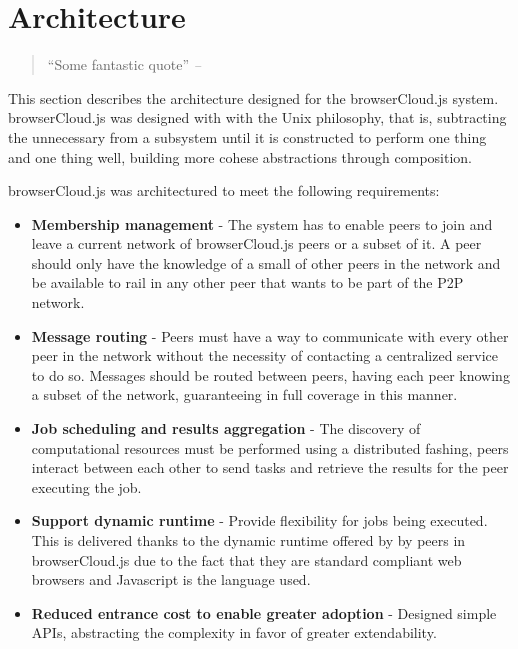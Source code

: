 \chapter{Architecture}\label{ch:architecture}

\begin{quotation}
“Some fantastic quote”
{\small\it --  }
\end{quotation}

This section describes the architecture designed for the browserCloud.js system. browserCloud.js was designed with with the Unix philosophy, that is, subtracting the unnecessary from a subsystem until it is constructed to perform one thing and one thing well, building more cohese abstractions through composition.

browserCloud.js was architectured to meet the following requirements:

\begin{itemize}
    \item \textbf{Membership management} - The system has to enable peers to join and leave a current network of browserCloud.js peers or a subset of it. A peer should only have the knowledge of a small of other peers in the network and be available to rail in any other peer that wants to be part of the P2P network.
    \item \textbf{Message routing} - Peers must have a way to communicate with every other peer in the network without the necessity of contacting a centralized service to do so. Messages should be routed between peers, having each peer knowing a subset of the network, guaranteeing in full coverage in this manner.
    \item \textbf{Job scheduling and results aggregation} - The discovery of computational resources must be performed using a distributed fashing, peers interact between each other to send tasks and retrieve the results for the peer executing the job.
    \item \textbf{Support dynamic runtime} - Provide flexibility for jobs being executed. This is delivered thanks to the dynamic runtime offered by by peers in browserCloud.js due to the fact that they are standard compliant web browsers and Javascript is the language used.
    \item \textbf{Reduced entrance cost to enable greater adoption} - Designed simple APIs, abstracting the complexity in favor of greater extendability.
\end{itemize}


